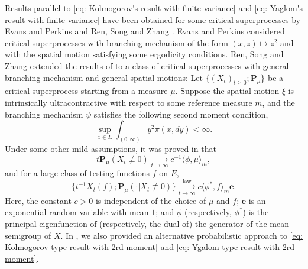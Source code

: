 \documentclass[12pt, a4paper]{amsart}
\theoremstyle{definition}
\numberwithin{equation}{section}
\begin{document}
	Results parallel to \eqref{eq: Kolmogorov's result with finite variance} and \eqref{eq: Yaglom's result with finite variance} have been obtained for some critical superprocesses by Evans and Perkins \cite{EvansPerkins1990Measure-valued} and Ren, Song and Zhang \cite{RenSongZhang2015Limit}.
	Evans and Perkins \cite{EvansPerkins1990Measure-valued} considered critical superprocesses with branching mechanism of the form $(x,z)\mapsto z^2$ and with the spatial motion satisfying some ergodicity conditions.
	Ren, Song and Zhang \cite{RenSongZhang2015Limit} extended the results of \cite{EvansPerkins1990Measure-valued} to  
	a class of critical superprocesses with general branching mechanism and general spatial motions:
	Let $\{(X_t)_{t\geq 0}; \mathbf P_\mu \}$ be a critical superprocess starting from a measure $\mu$.
	Suppose the spatial motion $\xi$ is intrinsically ultracontractive with respect to some reference measure $m$, and the branching mechanism $\psi$ satisfies the following second moment condition,
\[\label{eq: second moment condition}
	\sup_{x\in E} \int_{(0,\infty)} y^2 \pi(x,dy)
	< \infty.
\]
	Under some other mild assumptions, it was proved in  \cite{RenSongZhang2015Limit} that
\[\label{eq: Kolmogorov type result with 2rd moment}
	t \mathbf P_\mu(X_t \not \equiv 0)
	\xrightarrow[t\to \infty]{} c^{-1} \langle \phi, \mu \rangle_m,
\]
	and for a large class of testing functions $f$ on $E$,
\[\label{eq: Ygalom type result with 2rd moment}
	\{ t^{-1}X_t(f); \mathbf P_\mu (\cdot | X_t \not\equiv 0)\}
	\xrightarrow[t\to \infty]{\operatorname{law}} c \langle \phi^*, f\rangle_m \mathbf e.
\]
	Here, the constant $c > 0$ is independent of the choice of $\mu$ and $f$;
	$\mathbf e$ is an exponential random variable with mean $1$;
	and $\phi$ (respectively, $\phi^*$) is the principal eigenfunction of (respectively, the dual of) the generator of the mean semigroup of $X$.
	In \cite{RenSongSun2017Spine}, we also provided an alternative probabilistic approach to \eqref{eq: Kolmogorov type result with 2rd moment} and \eqref{eq: Ygalom type result with 2rd moment}.
	
\end{document}

